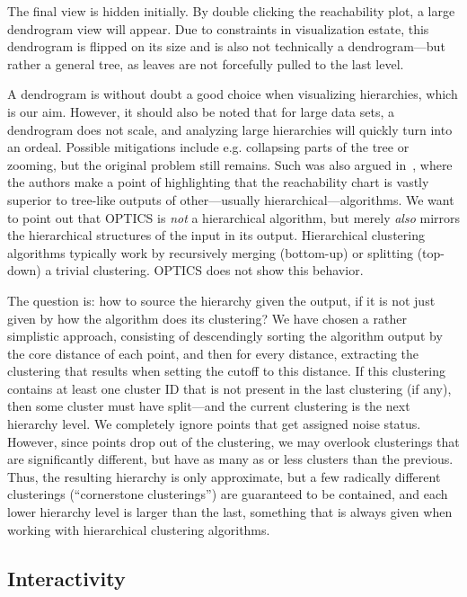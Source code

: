 \documentclass{vgtc} %
\begin{document}
The final view is hidden initially. By double clicking the reachability plot, a
large dendrogram view will appear. Due to constraints in visualization estate,
this dendrogram is flipped on its size and is also not technically a dendrogram---but
rather a general tree, as leaves are not forcefully pulled to the last level.

A dendrogram is without doubt a good choice when visualizing hierarchies, which
is our aim. However, it should also be noted that for large data sets, a
dendrogram does not scale, and analyzing large hierarchies will quickly turn
into an ordeal. Possible mitigations include e.g. collapsing parts of the tree
or zooming, but the original problem still remains. Such was also argued
in~\cite{optics}, where the authors make a point of highlighting that the
reachability chart is vastly superior to tree-like outputs of
other---usually hierarchical---algorithms. We want to point out that OPTICS is
\emph{not} a hierarchical algorithm, but merely \emph{also} mirrors the
hierarchical structures of the input in its output. Hierarchical clustering
algorithms typically work by recursively merging (bottom-up) or splitting
(top-down) a trivial clustering. OPTICS does not show this behavior.

The question is: how to source the hierarchy given the output, if it is not
just given by how the algorithm does its clustering? We have chosen a rather
simplistic approach, consisting of descendingly sorting the algorithm output by
the core distance of each point, and then for every distance, extracting the
clustering that results when setting the cutoff to this distance. If this
clustering contains at least one cluster ID that is not present in the last
clustering (if any), then some cluster must have split---and the current
clustering is the next hierarchy level. We completely ignore points that get
assigned noise status. However, since points drop out of the clustering, we
may overlook clusterings that are significantly different, but have as many as
or less clusters than the previous. Thus, the resulting hierarchy is only
approximate, but a few radically different clusterings (``cornerstone
clusterings'') are guaranteed to be contained, and each lower hierarchy level
is larger than the last, something that is always given when working with
hierarchical clustering algorithms.

\subsection{Interactivity}
\end{document}
